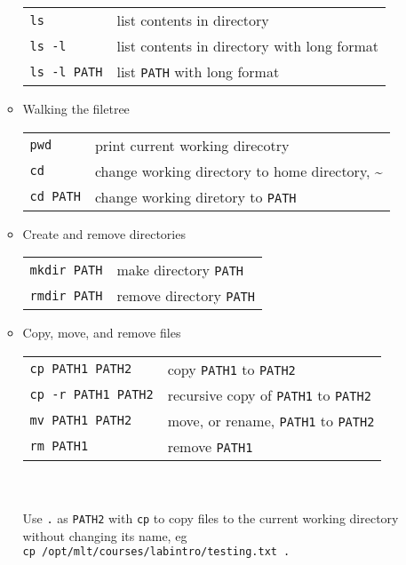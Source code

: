 \documentclass[a4,landscape]{seminar}
\begin{document}
\begin{slide}
\begin{itemize}
\begin{itemize}
      \begin{tabular}{|l|l|}
        \hline
        \texttt{ls} & list contents in directory\\
        \texttt{ls -l} & list contents in directory with long format\\
        \texttt{ls -l PATH} & list \texttt{PATH} with long format\\\hline
      \end{tabular}
    \item Walking the filetree\\[1ex]
      \begin{tabular}{|l|l|}
        \hline
        \texttt{pwd} & print current working direcotry\\
        \texttt{cd} & change working directory to home directory, \textasciitilde\\
        \texttt{cd PATH} & change working diretory to \texttt{PATH}\\\hline
      \end{tabular}
    \item Create and remove directories\\[1ex]
      \begin{tabular}{|l|l|}
        \hline
        \texttt{mkdir PATH} & make directory \texttt{PATH}\\
        \texttt{rmdir PATH} & remove directory \texttt{PATH}\\\hline
      \end{tabular}
      \clearpage{}
    \item Copy, move, and remove files
      \begin{tabular}{|l|l|}
        \hline
        \texttt{cp PATH1 PATH2} & copy \texttt{PATH1} to \texttt{PATH2}\\
        \texttt{cp -r PATH1 PATH2} & recursive copy of \texttt{PATH1} to \texttt{PATH2}\\
        \texttt{mv PATH1 PATH2} & move, or rename, \texttt{PATH1} to \texttt{PATH2}\\
        \texttt{rm PATH1} & remove \texttt{PATH1}\\\hline
      \end{tabular}\\\\
      Use \texttt{.} as \texttt{PATH2} with \texttt{cp} to copy files to the current working directory without changing its name, eg\\[1ex]
      \texttt{cp /opt/mlt/courses/labintro/testing.txt .}\\[1ex]

\end{itemize}
\end{itemize}
\end{slide}
\end{document}
